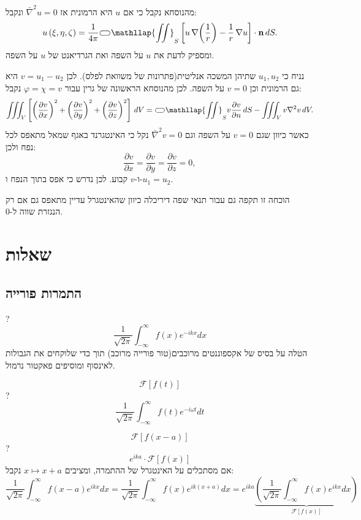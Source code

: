 \documentclass{tstextbook}
\begin{document}
\begin{proposition}
מהנוסחא נקבל כי אם \(u\) היא הרמונית אז \(\bar{\nabla}^2u=0\)  ונקבל:
$$u\left( \xi,\eta,\zeta \right)=\frac{1}{4\pi}{\subset\!\supset} \mathllap{\iint}_{S}\left[u\,\nabla\!\left(\frac{1}{r}\right)-\frac{1}{r}\,\nabla u\right]\cdot\mathbf{n}\,d S.$$
ומספיק לדעת את \(u\) על השפה ואת הגרדיאנט של \(u\) על השפה. 

\end{proposition}
\begin{corollary}
נניח כי \(u_{1},u_{2}\) שתיהן המשכה אנליטית(פתרונות של משוואת לפלס). לכן \(v=u_{1}-u_{2}\) היא גם הרמונית וכן \(v=0\) על השפה. לכן מהנוסחא הראשונה של גרין עבור \(\varphi=\chi=v\) נקבל:
$$\iiint_{V}\left[\left({\frac{\partial v}{\partial x}}\right)^{2}+\left({\frac{\partial v}{\partial y}}\right)^{2}+\left({\frac{\partial v}{\partial z}}\right)^{2}\right]\,d V={\subset\!\supset} \mathllap{\iint}_{S}v{\frac{\partial v}{\partial n}}\,d S-\iiint_{V}v\nabla^{2}v\,d V.$$
כאשר כיוון שגם \(v=0\) על השפה וגם \(\bar{\nabla}^2v=0\) נקל כי האינטגרנד באגף שמאל מתאפס לכל נפח ולכן:
$${\frac{\partial v}{\partial x}}={\frac{\partial v}{\partial y}}={\frac{\partial v}{\partial z}}=0,$$
ו-\(v\) קבוע. לכן נדרש כי אפס בתוך הנפח ו-\(u_{1}=u_{2}\).

\end{corollary}
\begin{remark}
הוכחה זו תקפה גם עבור תנאי שפה דיריכלה כיוון שהאינטגרל עדיין מתאפס גם אם רק הנגזרת שווה ל-0.

\end{remark}
\chapter{שאלות}

\section{התמרות פורייה}

?
$$\frac{1}{\sqrt{ 2\pi }}\int_{-\infty}^\infty f(x)e^{-ikx}dx $$
הטלה על בסיס של אקספוננטים מרוכבים(טור פורייה מרוכב) תוך כדי שלוקחים את הגבולות לאינסוף ומוסיפים פאקטור נרמול.

$$\mathcal{F} [f(t)]$$
?
$$\frac{1}{\sqrt{ 2\pi }}\int_{-\infty}^\infty f(t)e^{-i\omega t}dt $$

$$\mathcal{F} [f(x-a)]$$
?
$$e^{ika}\cdot \mathcal{F} [f(x)]$$
אם מסתכלים על האינטגרל של ההתמרה, ומציבים \(x\mapsto x+a\) נקבל:
$$\frac{1}{\sqrt{ 2 \pi}} \int_{-\infty}^\infty f(x-a)e^{ikx}dx=\frac{1}{\sqrt{ 2\pi }}\int_{-\infty}^\infty f(x)e^{ik(x+a)}dx =e^{ika}\underbrace{ \left( \frac{1}{\sqrt{ 2\pi }}\int_{-\infty}^{\infty} f(x)e^{ikx} dx\right) }_{ \mathcal{F} [f(x)] }$$
\end{document}
